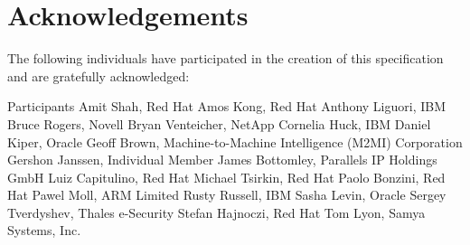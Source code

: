\chapter{Acknowledgements}

The following individuals have participated in the creation of this specification and are gratefully acknowledged:

\begin{oasistitlesection}{Participants}
Amit Shah,	Red Hat	\newline
Amos Kong,	Red Hat	\newline
Anthony Liguori,	IBM	\newline
Bruce Rogers,	Novell	\newline
Bryan Venteicher,	NetApp	\newline
Cornelia Huck,	IBM	\newline
Daniel Kiper,	Oracle	\newline
Geoff Brown,	Machine-to-Machine Intelligence (M2MI) Corporation	\newline
Gershon Janssen,	Individual Member	\newline
James Bottomley,	Parallels IP Holdings GmbH	\newline
Luiz Capitulino,	Red Hat	\newline
Michael Tsirkin,	Red Hat	\newline
Paolo Bonzini,	Red Hat	\newline
Pawel Moll,	ARM Limited	\newline
Rusty Russell,	IBM	\newline
Sasha Levin,	Oracle	\newline
Sergey Tverdyshev,	Thales e-Security	\newline
Stefan Hajnoczi,	Red Hat	\newline
Tom Lyon,	Samya Systems, Inc.	\newline
\end{oasistitlesection}
